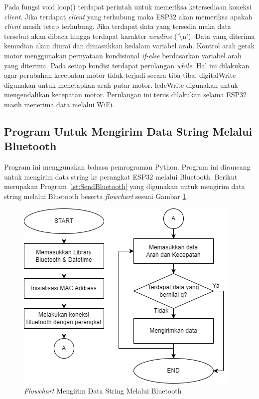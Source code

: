 Pada fungsi void loop() terdapat perintah untuk memeriksa ketersediaan koneksi \emph{client}. Jika terdapat \emph{client} yang terhubung maka ESP32 akan memeriksa apakah \emph{client} masih tetap terhubung. Jika terdapat data yang tersedia maka data tersebut akan dibaca hingga terdapat karakter \emph{newline} ('\textbackslash n'). Data yang diterima kemudian akan diurai dan dimasukkan kedalam variabel arah. Kontrol arah gerak motor menggunakan pernyataan kondisional \emph{if-else} berdasarkan variabel arah yang diterima. Pada setiap kondisi terdapat perulangan \emph{while}. Hal ini dilakukan agar perubahan kecepatan motor tidak terjadi secara tiba-tiba. digitalWrite digunakan untuk menetapkan arah putar motor. ledcWrite digunakan untuk mengendalikan kecepatan motor. Perulangan ini terus dilakukan selama ESP32 masih menerima data melalui WiFi.

\subsection{Program Untuk Mengirim Data String Melalui Bluetooth}

Program ini menggunakan bahasa pemrograman Python. Program ini dirancang untuk mengirim data string ke perangkat ESP32 melalui Bluetooth. Berikut merupakan Program \ref{lst:SendBluetooth} yang digunakan untuk mengirim data string melalui Bluetooth beserta \emph{flowchart} sesuai Gambar \ref{fig:Flowchart 9 Mengirim String Bluetooth}.

\begin{figure} [ht] \centering
  \includegraphics[scale=0.65]{gambar/program/9. Mengirim Data String Bluetooth.png}
  \caption{\emph{Flowchart} Mengirim Data String Melalui Bluetooth}
  \label{fig:Flowchart 9 Mengirim String Bluetooth}
\end{figure}

